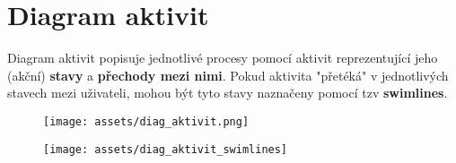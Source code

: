\pagebreak
\section{Diagram aktivit}
Diagram aktivit popisuje jednotlivé procesy pomocí aktivit reprezentující jeho (akční) \textbf{stavy} a \textbf{přechody mezi nimi}. Pokud aktivita "přetéká" v jednotlivých stavech mezi uživateli, mohou být tyto stavy naznačeny pomocí tzv \textbf{swimlines}.
\begin{figure}[H]
    \centering
    \texttt{[image: assets/diag\_aktivit.png]}
\end{figure}

\begin{figure}[H]
    \centering
    \texttt{[image: assets/diag\_aktivit\_swimlines]}
\end{figure}